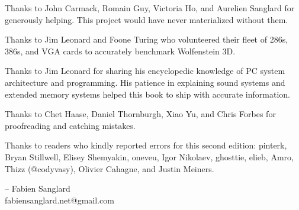 Thanks to John Carmack, Romain Guy, Victoria Ho, and Aurelien Sanglard for generously helping. This project would have never
materialized without them.\\ 
\par
Thanks to  Jim Leonard and Foone Turing who volunteered their fleet of 286s, 386s, and VGA cards to accurately benchmark Wolfenstein 3D.\\
\par
Thanks to  Jim Leonard for sharing his encyclopedic knowledge of PC system architecture and programming. His patience in explaining sound systems and extended memory systems helped this book to ship with accurate information.\\
\par
Thanks to  Chet Haase, Daniel Thornburgh, Xiao Yu, and Chris Forbes for proofreading and catching mistakes.\\
\par
Thanks to readers who kindly reported errors for this second edition: pinterk, Bryan Stillwell, Elisey Shemyakin, oneveu, Igor Nikolaev, ghosttie, elieb, Amro, Thizz (@codyvasy), Olivier Cahagne, and Justin Meiners.\\
\par
-- Fabien Sanglard\\
fabiensanglard.net@gmail.com
